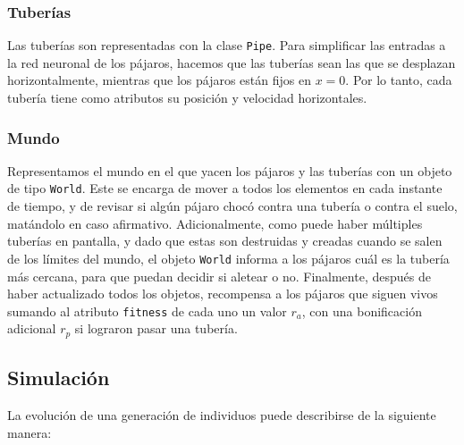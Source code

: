 \documentclass[twocolumn,spanish]{revtex4-1}
\begin{document}
\subsubsection{Tuberías}
Las tuberías son representadas con la clase \texttt{Pipe}. Para simplificar las entradas a la red neuronal de los pájaros, hacemos que las tuberías sean las que se desplazan horizontalmente, mientras que los pájaros están fijos en $x=0$. Por lo tanto, cada tubería tiene como atributos su posición y velocidad horizontales.

\subsubsection{Mundo}
Representamos el mundo en el que yacen los pájaros y las tuberías con un objeto de tipo \texttt{World}. Este se encarga de mover a todos los elementos en cada instante de tiempo, y de revisar si algún pájaro chocó contra una tubería o contra el suelo, matándolo en caso afirmativo. Adicionalmente, como puede haber múltiples tuberías en pantalla, y dado que estas son destruidas y creadas cuando se salen de los límites del mundo, el objeto \texttt{World} informa a los pájaros cuál es la tubería más cercana, para que puedan decidir si aletear o no. Finalmente, después de haber actualizado todos los objetos, recompensa a los pájaros que siguen vivos sumando al atributo \texttt{fitness} de cada uno un valor $r_a$, con una bonificación adicional $r_p$ si lograron pasar una tubería.

\subsection{Simulación}
La evolución de una generación de individuos puede describirse de la siguiente manera:
\end{document}
